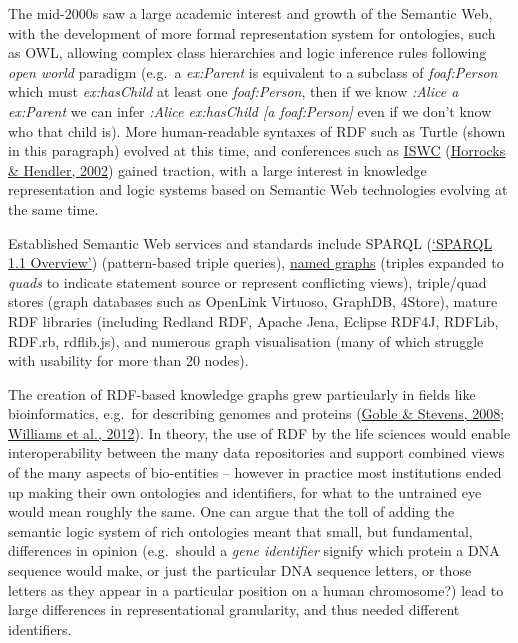 The mid-2000s saw a large academic interest and growth of the Semantic Web, with the development of more formal representation system for ontologies, such as OWL, allowing complex class hierarchies and logic inference rules following \emph{open world} paradigm (e.g.~a \emph{ex:Parent} is equivalent to a subclass of \emph{foaf:Person} which must \emph{ex:hasChild} at least one \emph{foaf:Person}, then if we know \emph{:Alice a ex:Parent} we can infer \emph{:Alice ex:hasChild {[}a foaf:Person{]}} even if we don't know who that child is). More human-readable syntaxes of RDF such as Turtle (shown in this paragraph) evolved at this time, and conferences such as \href{https://iswc2022.semanticweb.org/}{ISWC} (\protect\hyperlink{ref-yd2WE9eq}{Horrocks \& Hendler, 2002}) gained traction, with a large interest in knowledge representation and logic systems based on Semantic Web technologies evolving at the same time.

Established Semantic Web services and standards include SPARQL (\protect\hyperlink{ref-xww8fb1B}{{`SPARQL 1.1 Overview'}}) (pattern-based triple queries), \href{https://www.w3.org/TR/rdf11-concepts/\#section-dataset}{named graphs} (triples expanded to \emph{quads} to indicate statement source or represent conflicting views), triple/quad stores (graph databases such as OpenLink Virtuoso, GraphDB, 4Store), mature RDF libraries (including Redland RDF, Apache Jena, Eclipse RDF4J, RDFLib, RDF.rb, rdflib.js), and numerous graph visualisation (many of which struggle with usability for more than 20 nodes).

The creation of RDF-based knowledge graphs grew particularly in fields like bioinformatics, e.g.~for describing genomes and proteins (\protect\hyperlink{ref-bMSxa8XW}{Goble \& Stevens, 2008}; \protect\hyperlink{ref-Qlrlr2TZ}{Williams et al., 2012}). In theory, the use of RDF by the life sciences would enable interoperability between the many data repositories and support combined views of the many aspects of bio-entities -- however in practice most institutions ended up making their own ontologies and identifiers, for what to the untrained eye would mean roughly the same. One can argue that the toll of adding the semantic logic system of rich ontologies meant that small, but fundamental, differences in opinion (e.g.~should a \emph{gene identifier} signify which protein a DNA sequence would make, or just the particular DNA sequence letters, or those letters as they appear in a particular position on a human chromosome?) lead to large differences in representational granularity, and thus needed different identifiers.

